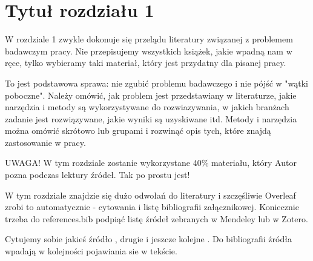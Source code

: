 \section{Tytuł rozdziału 1}

W rozdziale 1 zwykle dokonuje się przelądu literatury związanej z problemem badawczym pracy. Nie przepisujemy wszystkich książek, jakie wpadną nam w ręce, tylko wybieramy taki materiał, który jest przydatny dla pisanej pracy.

To jest podstawowa sprawa: nie zgubić problemu badawczego i nie pójść w "wątki poboczne". Należy omówić, jak problem jest przedstawiany w literaturze, jakie narzędzia i metody są wykorzystywane do rozwiazywania, w jakich branżach zadanie jest rozwiązywane, jakie wyniki są uzyskiwane itd. Metody i narzędzia można omówić skrótowo lub grupami i rozwinąć opis tych, które znajdą zastosowanie w pracy.


UWAGA! W tym rozdziale zostanie wykorzystane 40\% materiału, który Autor pozna podczas lektury źródeł. Tak po prostu jest!

W tym rozdziale znajdzie się dużo odwołań do literatury i szczęśliwie Overleaf zrobi to automatycznie - cytowania i listę bibliografii załącznikowej. Koniecznie trzeba do references.bib podpiąć listę źródeł zebranych w Mendeley lub w Zotero.

Cytujemy sobie jakieś źródło \cite{Fattahi2020AModels}, drugie \cite{Asefi2019VariableManagement} i jeszcze kolejne \cite{Dolinina2019DevelopmentSettlementsb}. Do bibliografii źródła wpadają w kolejności pojawiania sie w tekście.